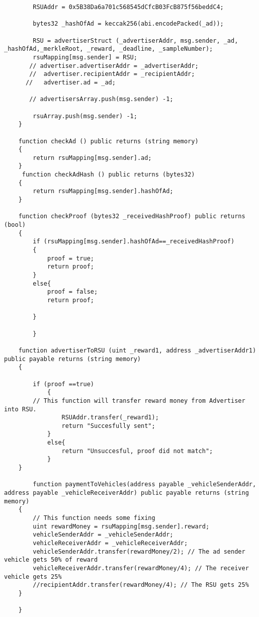 \begin{linenumbers}
\begin{lstlisting}
        RSUAddr = 0x5B38Da6a701c568545dCfcB03FcB875f56beddC4;

        bytes32 _hashOfAd = keccak256(abi.encodePacked(_ad));

        RSU = advertiserStruct (_advertiserAddr, msg.sender, _ad, _hashOfAd,_merkleRoot, _reward, _deadline, _sampleNumber);
        rsuMapping[msg.sender] = RSU;
       // advertiser.advertiserAddr = _advertiserAddr;
       //  advertiser.recipientAddr = _recipientAddr;
      //   advertiser.ad = _ad;
        
       // advertisersArray.push(msg.sender) -1;

        rsuArray.push(msg.sender) -1;
    }

    function checkAd () public returns (string memory)
    {
        return rsuMapping[msg.sender].ad;
    }
     function checkAdHash () public returns (bytes32)
    {
        return rsuMapping[msg.sender].hashOfAd;
    }

    function checkProof (bytes32 _receivedHashProof) public returns (bool)
    {
        if (rsuMapping[msg.sender].hashOfAd==_receivedHashProof)
        {
            proof = true;
            return proof;
        }
        else{
            proof = false;
            return proof;

        }

        }
        
    function advertiserToRSU (uint _reward1, address _advertiserAddr1) public payable returns (string memory)
    {
        
        if (proof ==true)
            {
        // This function will transfer reward money from Advertiser into RSU. 
                RSUAddr.transfer(_reward1);
                return "Succesfully sent";
            }
            else{
                return "Unsuccesful, proof did not match";
            }
    }

        function paymentToVehicles(address payable _vehicleSenderAddr, address payable _vehicleReceiverAddr) public payable returns (string memory)
    {
        // This function needs some fixing
        uint rewardMoney = rsuMapping[msg.sender].reward;
        vehicleSenderAddr = _vehicleSenderAddr;
        vehicleReceiverAddr = _vehicleReceiverAddr;
        vehicleSenderAddr.transfer(rewardMoney/2); // The ad sender vehicle gets 50% of reward
        vehicleReceiverAddr.transfer(rewardMoney/4); // The receiver vehicle gets 25%
        //recipientAddr.transfer(rewardMoney/4); // The RSU gets 25%
    }

    }

\end{lstlisting}
\end{linenumbers} 